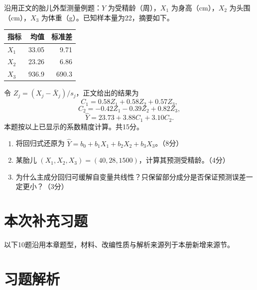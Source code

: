 \par\addvspace{6pt}\noindent\begin{minipage}{\linewidth}


沿用正文的胎儿外型测量例题：\(Y\) 为受精龄（周），\(X_1\) 为身高（cm），\(X_2\) 为头围（cm），\(X_3\) 为体重（g）。已知样本量为22，摘要如下。

\begin{center}\small\setlength{\tabcolsep}{4pt}\renewcommand{\arraystretch}{1.18}\begin{tabular}{@{}lrr@{}}
\toprule
指标 & 均值 & 标准差 \\
\midrule

\(X_1\) & 33.05 & 9.71 \\
\(X_2\) & 23.26 & 6.86 \\
\(X_3\) & 936.9 & 690.3 \\
\bottomrule\end{tabular}\end{center}

令 \(Z_j=(X_j-\bar X_j)/s_j\)，正文给出的结果为 \[C_1=0.58Z_1+0.58Z_2+0.57Z_3,\] \[C_2=-0.42Z_1-0.39Z_2+0.82Z_3,\] \[\widehat Y=23.73+3.88C_1+3.10C_2.\] 本题按以上已显示的系数精度计算。共15分。

\begin{enumerate}
\def\labelenumi{\arabic{enumi}.}
\tightlist
\item
  将回归式还原为 \(\widehat Y=b_0+b_1X_1+b_2X_2+b_3X_3\)。（8分）
\item
  某胎儿 \((X_1,X_2,X_3)=(40,28,1500)\)，计算其预测受精龄。（4分）
\item
  为什么主成分回归可缓解自变量共线性？只保留部分成分是否保证预测误差一定更小？（3分）
\end{enumerate}



\end{minipage}\par\vspace{4pt}
\clearpage\section{本次补充习题}
以下10题沿用本章题型，材料、改编性质与解析来源列于本册新增来源节。


\clearpage\section{习题解析}

